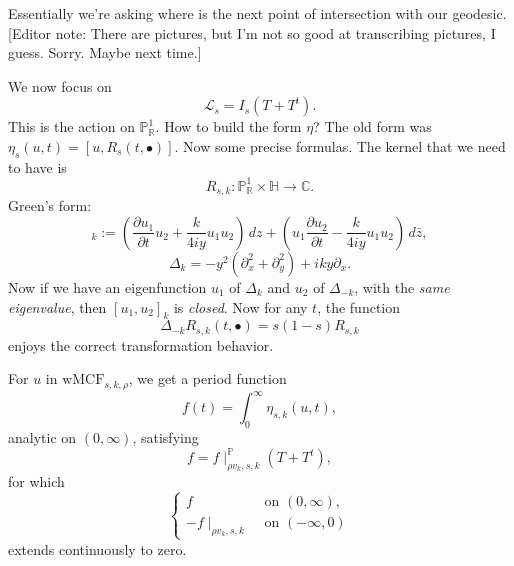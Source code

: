 \documentclass[reqno]{amsart} 
\numberwithin{theorem}{section}
\numberwithin{equation}{section}
\begin{document}
\begin{enumerate}
\begin{remark}
\begin{equation*}
    \end{equation*}
    Essentially we're asking where is the next point of intersection with our geodesic.  [Editor note: There are pictures, but I'm not so good at transcribing pictures, I guess.  Sorry.  Maybe next time.]
  \end{remark}
  We now focus on
  \begin{equation*}
    \mathcal{L}_s = I_s(T + T^t).
  \end{equation*}
  This is the action on $\mathbb{P}_{\mathbb{R}}^1$.  How to build the form $\eta$?  The old form was $\eta_s(u, t) =[u, R_s(t, \bullet)]$.  Now some precise formulas.  The kernel that we need to have is
  \begin{equation*}
    R_{s, k} : \mathbb{P}_{\mathbb{R}}^1 \times \mathbb{H} \rightarrow \mathbb{C}.
  \end{equation*}
  Green's form:
  \begin{equation*}
    [u_1, u_2]_k :=
    \left( \frac{\partial u_1}{\partial t} u_2 + \frac{k}{4 i y} u_1 u_2  \right) \, d z
    + 
    \left( u_1 \frac{\partial u_2}{\partial t} - \frac{k}{4 i y} u_1 u_2 \right) \, d \bar{z},
  \end{equation*}
  \begin{equation*}
    \Delta_k = - y^2(\partial_x^2 + \partial_y^2) + i k y \partial_x.
  \end{equation*}
  Now if we have an eigenfunction $u_1$ of $\Delta_k$ and $u_2$ of $\Delta_{- k}$, with the \emph{same eigenvalue}, then $[u_1, u_2]_k$ is \emph{closed}.  Now for any $t$, the function
  \begin{equation*}
    \Delta_{- k} R_{s, k}(t, \bullet) = s(1 - s) R_{s, k}
  \end{equation*}
  enjoys the correct transformation behavior.

  For $u$ in $\mathrm{wMCF}_{s, k, \rho}$, we get a period function
  \begin{equation*}
    f(t) = \int_0^\infty \eta_{s, k}(u, t),
  \end{equation*}
  analytic on $(0, \infty)$, satisfying
  \begin{equation*}
    f = f \mid_{\rho v_k, s, k}^{\mathbb{P}}(T + T^t),
  \end{equation*}
  for which
  \begin{equation*}
    \begin{cases}
      f      &  \text{ on }(0, \infty), \\
      -f \mid_{\rho v_k , s , k}             &  \text{ on }(- \infty, 0)
    \end{cases}
  \end{equation*}
  extends continuously to zero.
\end{enumerate}
\end{document}
